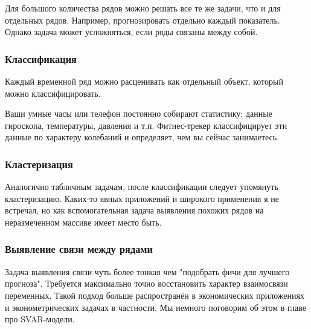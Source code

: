 \documentclass[12pt,fleqn]{article}
\begin{document}
Для большого количества рядов можно решать все те же задачи, что и для отдельных рядов. Например, прогнозировать отдельно каждый показатель. Однако задача может усложняться, если ряды связаны между собой.

\subsubsection{Классификация}
Каждый временной ряд можно расценивать как отдельный объект, который можно классифицировать. 

\begin{example}
	Ваши умные часы или телефон постоянно собирают статистику: данные гироскопа, температуры, давления и т.п. Фитнес-трекер классифицирует эти данные по характеру колебаний и определяет, чем вы сейчас занимаетесь.
\end{example}

\subsubsection{Кластеризация}

Аналогично табличным задачам, после классификации следует упомянуть кластеризацию. Каких-то явных приложений и широкого применения я не встречал, но как вспомогательная задача выявления похожих рядов на неразмеченном массиве имеет место быть.

\subsubsection{Выявление связи между рядами}

Задача выявления связи чуть более тонкая чем "подобрать фичи для лучшего прогноза". Требуется максимально точно восстановить характер взаимосвязи переменных. Такой подход больше распространён в экономических приложениях и эконометрических задачах в частности. Мы немного поговорим об этом в главе про SVAR-модели.
\end{document}
